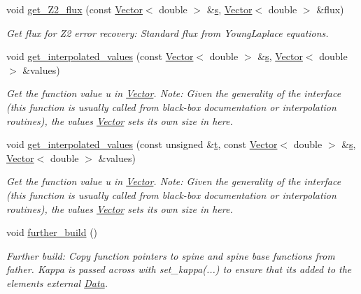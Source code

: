 \begin{DoxyCompactItemize}
void \hyperlink{classoomph_1_1RefineableYoungLaplaceEquations_ab8d8c6010331d8076a5d6369d331eb4d}{get\+\_\+\+Z2\+\_\+flux} (const \hyperlink{classoomph_1_1Vector}{Vector}$<$ double $>$ \&\hyperlink{cfortran_8h_ab7123126e4885ef647dd9c6e3807a21c}{s}, \hyperlink{classoomph_1_1Vector}{Vector}$<$ double $>$ \&flux)
\begin{DoxyCompactList}\small\item\em Get \textquotesingle{}flux\textquotesingle{} for Z2 error recovery\+: Standard flux from Young\+Laplace equations. \end{DoxyCompactList}\item 
void \hyperlink{classoomph_1_1RefineableYoungLaplaceEquations_ab54a23095ee8aef3fe68542bdfa1400a}{get\+\_\+interpolated\+\_\+values} (const \hyperlink{classoomph_1_1Vector}{Vector}$<$ double $>$ \&\hyperlink{cfortran_8h_ab7123126e4885ef647dd9c6e3807a21c}{s}, \hyperlink{classoomph_1_1Vector}{Vector}$<$ double $>$ \&values)
\begin{DoxyCompactList}\small\item\em Get the function value u in \hyperlink{classoomph_1_1Vector}{Vector}. Note\+: Given the generality of the interface (this function is usually called from black-\/box documentation or interpolation routines), the values \hyperlink{classoomph_1_1Vector}{Vector} sets its own size in here. \end{DoxyCompactList}\item 
void \hyperlink{classoomph_1_1RefineableYoungLaplaceEquations_a0fad7813f5ad8046353921f263c1af05}{get\+\_\+interpolated\+\_\+values} (const unsigned \&\hyperlink{cfortran_8h_af6f0bd3dc13317f895c91323c25c2b8f}{t}, const \hyperlink{classoomph_1_1Vector}{Vector}$<$ double $>$ \&\hyperlink{cfortran_8h_ab7123126e4885ef647dd9c6e3807a21c}{s}, \hyperlink{classoomph_1_1Vector}{Vector}$<$ double $>$ \&values)
\begin{DoxyCompactList}\small\item\em Get the function value u in \hyperlink{classoomph_1_1Vector}{Vector}. Note\+: Given the generality of the interface (this function is usually called from black-\/box documentation or interpolation routines), the values \hyperlink{classoomph_1_1Vector}{Vector} sets its own size in here. \end{DoxyCompactList}\item 
void \hyperlink{classoomph_1_1RefineableYoungLaplaceEquations_a9c663f1cb9fec2a0d5ec263313741e74}{further\+\_\+build} ()
\begin{DoxyCompactList}\small\item\em Further build\+: Copy function pointers to spine and spine base functions from father. Kappa is passed across with set\+\_\+kappa(...) to ensure that it\textquotesingle{}s added to the element\textquotesingle{}s external \hyperlink{classoomph_1_1Data}{Data}. \end{DoxyCompactList}\end{DoxyCompactItemize}
